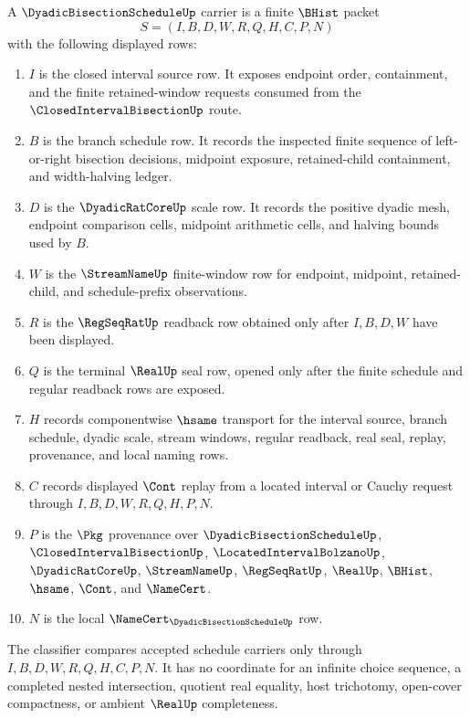 \begin{definition}
\label{def:dyadic-bisection-schedule-carrier}
A $\DyadicBisectionScheduleUp$ carrier is a finite $\BHist$ packet
$$
S=(I,B,D,W,R,Q,H,C,P,N)
$$
with the following displayed rows:
\begin{enumerate}
\item $I$ is the closed interval source row. It exposes endpoint order, containment, and the finite retained-window requests consumed from the $\ClosedIntervalBisectionUp$ route.
\item $B$ is the branch schedule row. It records the inspected finite sequence of left-or-right bisection decisions, midpoint exposure, retained-child containment, and width-halving ledger.
\item $D$ is the $\DyadicRatCoreUp$ scale row. It records the positive dyadic mesh, endpoint comparison cells, midpoint arithmetic cells, and halving bounds used by $B$.
\item $W$ is the $\StreamNameUp$ finite-window row for endpoint, midpoint, retained-child, and schedule-prefix observations.
\item $R$ is the $\RegSeqRatUp$ readback row obtained only after $I,B,D,W$ have been displayed.
\item $Q$ is the terminal $\RealUp$ seal row, opened only after the finite schedule and regular readback rows are exposed.
\item $H$ records componentwise $\hsame$ transport for the interval source, branch schedule, dyadic scale, stream windows, regular readback, real seal, replay, provenance, and local naming rows.
\item $C$ records displayed $\Cont$ replay from a located interval or Cauchy request through $I,B,D,W,R,Q,H,P,N$.
\item $P$ is the $\Pkg$ provenance over $\DyadicBisectionScheduleUp$, $\ClosedIntervalBisectionUp$, $\LocatedIntervalBolzanoUp$, $\DyadicRatCoreUp$, $\StreamNameUp$, $\RegSeqRatUp$, $\RealUp$, $\BHist$, $\hsame$, $\Cont$, and $\NameCert$.
\item $N$ is the local $\NameCert_{\DyadicBisectionScheduleUp}$ row.
\end{enumerate}
The classifier compares accepted schedule carriers only through $I,B,D,W,R,Q,H,C,P,N$. It has no coordinate for an infinite choice sequence, a completed nested intersection, quotient real equality, host trichotomy, open-cover compactness, or ambient $\RealUp$ completeness.
\end{definition}


